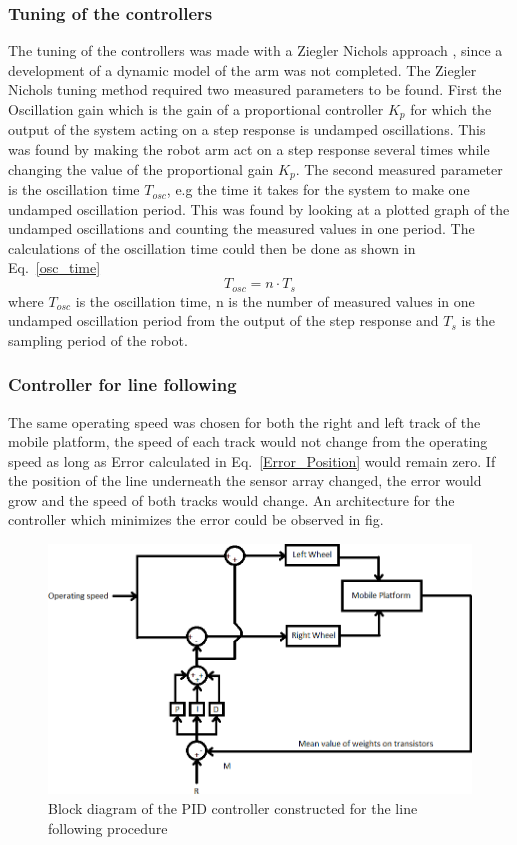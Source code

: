 \subsubsection{Tuning of the controllers}
\label{sec:simon10}
The tuning of the controllers was made with a Ziegler Nichols approach \parencite{FeedbackControl}, since a development of a dynamic model of the arm was not completed. The Ziegler Nichols tuning method required two measured parameters to be found. First the Oscillation gain which is the gain of a proportional controller \(K_p\) for which the output of the system acting on a step response is undamped oscillations. This was found by making the robot arm act on a step response several times while changing the value of the proportional gain \(K_p\). The second measured parameter is the oscillation time \(T_{osc}\), e.g the time it takes for the system to make one undamped oscillation period. This was found by looking at a plotted graph of the undamped oscillations and counting the measured values in one period. The calculations of the oscillation time could then be done as shown in Eq.~\eqref{osc_time}
\begin{equation}
    T_{osc} = n\cdot T_s
    \label{osc_time}
\end{equation}
where \(T_{osc}\) is the oscillation time, n is the number of measured values in one undamped oscillation period from the output of the step response and \(T_s\) is the sampling period of the robot.

\subsubsection{Controller for line following}
The same operating speed was chosen for both the right and left track of the mobile platform, the speed of each track would not change from the operating speed as long as Error calculated in Eq.~\eqref{Error_Position} would remain zero. If the position of the line underneath the sensor array changed, the error would grow and the speed of both tracks would change. An architecture for the controller which minimizes the error could be observed in fig.

\begin{figure}[h]
    \centering
    \includegraphics[width=\linewidth]{sections/assets/Control_system1.PNG}
    \caption{Block diagram of the PID controller constructed for the line following procedure}
    \label{Control_system1}
\end{figure}

